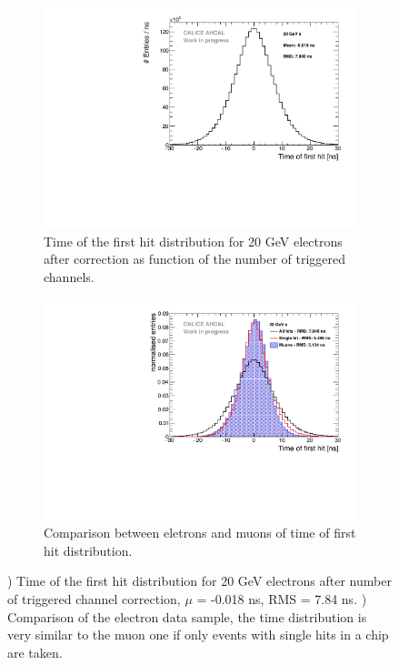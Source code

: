\begin{figure}[htbp!]
	\begin{subfigure}[t]{0.5\textwidth}
		\centering
		\includegraphics[width=1\textwidth]{chap5/fig_AHCAL_timing/Electrons/Timing_AllLayers_20GeV.pdf}
		\caption{Time of the first hit distribution for 20 GeV electrons after correction as function of the number of triggered channels.}\label{fig:timing_electrons_corr}
	\end{subfigure}
	\hfill
	\begin{subfigure}[t]{0.5\textwidth}
		\centering
		\includegraphics[width=1\textwidth]{chap5/fig_AHCAL_timing/Electrons/ComparisonAll_ElectronsSingleHit.pdf}
		\caption{Comparison between eletrons and muons of time of first hit distribution.}\label{fig:timing_electron_muon_comp}
	\end{subfigure}
	\caption{) Time of the first hit distribution for 20 GeV electrons after number of triggered channel correction, $\mu$ = -0.018 ns, RMS = 7.84 ns. ) Comparison of the electron data sample, the time distribution is very similar to the muon one if only events with single hits in a chip are taken.}
\end{figure}

